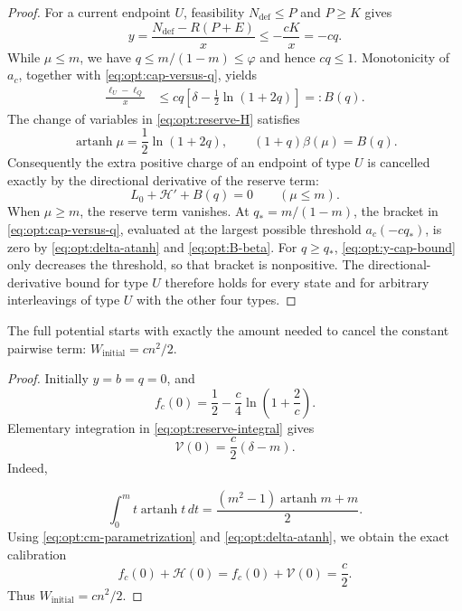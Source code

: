 \begin{proof}
For a current endpoint $U$, feasibility $N_{\mathrm{def}}\le P$ and
$P\ge K$ gives
\begin{equation}
 y=\frac{N_{\mathrm{def}}-R(P+E)}x\le-\frac{cK}{x}=-cq.
 \label{eq:opt:y-cap-bound}
\end{equation}
While $\mu\le m$, we have $q\le m/(1-m)\le\varphi$ and hence
$cq\le1$.  Monotonicity of $a_c$, together with
\eqref{eq:opt:cap-versus-q}, yields
\begin{align}
 \frac{\ell_U-\ell_Q}{x}
 &\le cq\left[\delta-\frac12\ln(1+2q)\right]
 =:B(q).
 \label{eq:opt:cap-residual-B}
\end{align}
The change of variables in \eqref{eq:opt:reserve-H} satisfies
\begin{equation}
 \operatorname{artanh}\mu=\frac12\ln(1+2q),
 \qquad
 (1+q)\beta(\mu)=B(q).
 \label{eq:opt:B-beta}
\end{equation}
Consequently the extra positive charge of an endpoint of type $U$ is
cancelled exactly by the directional derivative of the reserve term:
\begin{equation}
 L_0+\mathcal H'+B(q)=0
 \qquad(\mu\le m).
 \label{eq:opt:reserve-cancellation}
\end{equation}
When $\mu\ge m$, the reserve term vanishes.  At
$q_*=m/(1-m)$, the bracket in
\eqref{eq:opt:cap-versus-q}, evaluated at the largest possible threshold
$a_c(-cq_*)$, is zero by
\eqref{eq:opt:delta-atanh} and \eqref{eq:opt:B-beta}.  For $q\ge q_*$,
\eqref{eq:opt:y-cap-bound} only decreases the threshold, so that bracket is
nonpositive.  The directional-derivative bound for type $U$ therefore holds
for every state and for arbitrary interleavings of type $U$ with the other
four types.
\end{proof}

\begin{claim}
\label{clm:opt:adaptive-calibration}
The full potential starts with exactly the amount needed to cancel the
constant pairwise term: $W_{\mathrm{initial}}=cn^2/2$.
\end{claim}

\begin{proof}
Initially $y=b=q=0$, and
\begin{equation}
 f_c(0)=\frac12-\frac c4\ln\!\left(1+\frac2c\right).
 \label{eq:opt:f-zero}
\end{equation}
Elementary integration in \eqref{eq:opt:reserve-integral} gives
\begin{equation}
 \mathcal V(0)=\frac c2(\delta-m).
 \label{eq:opt:V-zero}
\end{equation}
Indeed,

\[
 \int_0^m t\operatorname{artanh}t\,dt
 =\frac{(m^2-1)\operatorname{artanh}m+m}{2}.
\]
Using \eqref{eq:opt:cm-parametrization} and
\eqref{eq:opt:delta-atanh}, we obtain the exact calibration
\begin{equation}
 f_c(0)+\mathcal H(0)
 =f_c(0)+\mathcal V(0)=\frac c2.
 \label{eq:opt:initial-calibration}
\end{equation}
Thus $W_{\mathrm{initial}}=cn^2/2$.
\end{proof}

